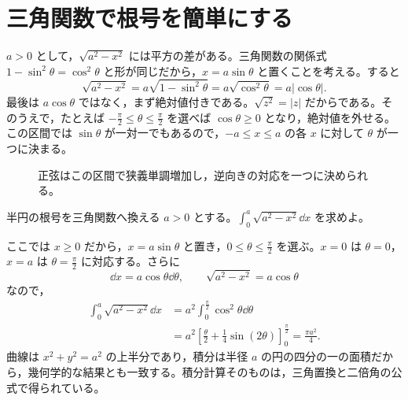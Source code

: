 \section{三角関数で根号を簡単にする}\label{節:三角置換の初歩}

$a>0$ として，$\sqrt{a^2-x^2}$ には平方の差がある。三角関数の関係式 $1-\sin^2\theta=\cos^2\theta$ と形が同じだから，$x=a\sin\theta$ と置くことを考える。すると
\[
 \sqrt{a^2-x^2}
 =a\sqrt{1-\sin^2\theta}
 =a\sqrt{\cos^2\theta}
 =a|\cos\theta|.
\]
最後は $a\cos\theta$ ではなく，まず絶対値付きである。$\sqrt{z^2}=|z|$ だからである。そのうえで，たとえば $-\frac\pi2\le\theta\le\frac\pi2$ を選べば $\cos\theta\ge0$ となり，絶対値を外せる。この区間では $\sin\theta$ が一対一でもあるので，$-a\le x\le a$ の各 $x$ に対して $\theta$ が一つに決まる。

\begin{figure}[htbp]
 \centering
 \caption{正弦はこの区間で狭義単調増加し，逆向きの対応を一つに決められる。}
 \label{図:正弦の枝}
\end{figure}

\begin{example}{半円の根号を三角関数へ換える}
$a>0$ とする。$\int_0^a\sqrt{a^2-x^2}\dd x$ を求めよ。
\end{example}

ここでは $x\ge0$ だから，$x=a\sin\theta$ と置き，$0\le\theta\le\frac\pi2$ を選ぶ。$x=0$ は $\theta=0$，$x=a$ は $\theta=\frac\pi2$ に対応する。さらに
\[
 \dd x=a\cos\theta\dd\theta,\qquad
 \sqrt{a^2-x^2}=a\cos\theta
\]
なので，
\[
\begin{aligned}
 \int_0^a\sqrt{a^2-x^2}\dd x
 &=a^2\int_0^{\frac\pi2}\cos^2\theta\dd\theta\\
 &=a^2\left[\frac\theta2+\frac14\sin(2\theta)\right]_0^{\frac\pi2}
 =\frac{\pi a^2}{4}.
\end{aligned}
\]
曲線は $x^2+y^2=a^2$ の上半分であり，積分は半径 $a$ の円の四分の一の面積だから，幾何学的な結果とも一致する。積分計算そのものは，三角置換と二倍角の公式で得られている。

